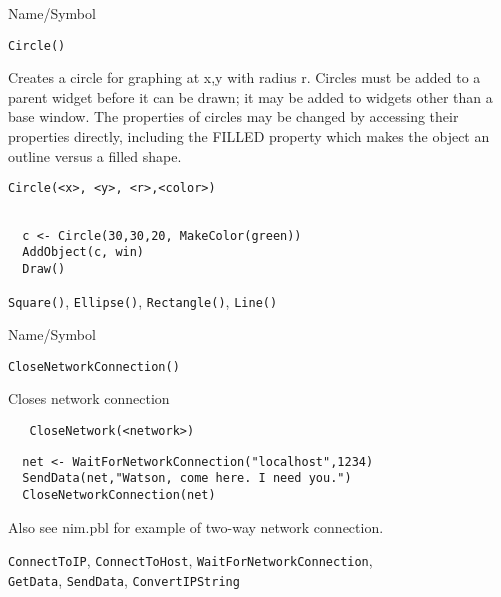\begin{desc}{Name/Symbol}
\item[Name/Symbol]	\verb+Circle()+

\item[Description] Creates a circle for graphing at x,y with radius r.
  Circles must be added to a parent widget before it can be drawn; it
  may be added to widgets other than a base window. The properties of
  circles may be changed by accessing their properties directly,
  including the FILLED property which makes the object an outline
  versus a filled shape.


\item[Usage]
\begin{verbatim}
Circle(<x>, <y>, <r>,<color>)
\end{verbatim}

\item[Example]	
\begin{verbatim}
  
  c <- Circle(30,30,20, MakeColor(green))
  AddObject(c, win)
  Draw()

\end{verbatim}
\item[See Also]	\verb+Square()+, \verb+Ellipse()+, \verb+Rectangle()+, \verb+Line()+
\end{desc}






\begin{desc}{Name/Symbol}
\item[Name/Symbol]	\verb+CloseNetworkConnection()+

\item[Description]	Closes network connection

\item[Usage]
\begin{verbatim}
   CloseNetwork(<network>)
\end{verbatim}

\item[Example]	

\begin{verbatim}
  net <- WaitForNetworkConnection("localhost",1234)
  SendData(net,"Watson, come here. I need you.")
  CloseNetworkConnection(net)
\end{verbatim}
Also see nim.pbl for example of two-way network connection.
\item[See Also]
  \verb+ConnectToIP+, \verb+ConnectToHost+,  \verb+WaitForNetworkConnection+, \\
  \verb+GetData+,  \verb+SendData+, \verb+ConvertIPString+
\end{desc}





